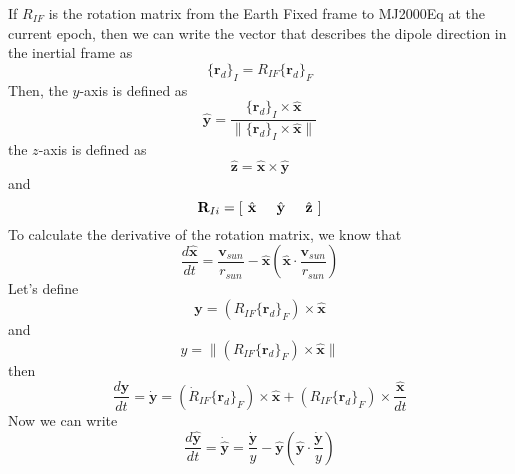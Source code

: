 {If $R_{IF}$ is the rotation matrix from the Earth Fixed frame to
MJ2000Eq at the current epoch, then we can write the vector that
describes the dipole direction in the inertial frame as
%
\begin{equation}
        \{\mathbf{r}_d\}_I =   R_{IF}\{\mathbf{r}_d\}_F
\end{equation}
%
Then, the $y$-axis is defined as
%
\begin{equation}
     \hat{\mathbf{y}} = \frac{\{\mathbf{r}_d\}_I \times \hat{\mathbf{x}}  }{\|  \{\mathbf{r}_d\}_I \times \hat{\mathbf{x}}   \|}
\end{equation}
%
the $z$-axis is defined as
%
\begin{equation}
     \hat{\mathbf{z}} = \hat{\mathbf{x}} \times \hat{\mathbf{y}}
\end{equation}
%
and
%
\begin{equation}
     \mathbf{R}_{Ii} = \left[\hspace{.05 in} \hat{\mathbf{x}} \hspace{.2 in} \hat{\mathbf{y}} \hspace{.2 in} \hat{\mathbf{z}} \hspace{.05 in} \right]
\end{equation}
%
To calculate the derivative of the rotation matrix, we know that
%
%
\begin{equation}
     \frac{d\hat{\mathbf{x}}}{dt} =      \displaystyle\frac{\mathbf{v}_{sun}}{r_{sun}}  -\displaystyle
     \hat{\mathbf{x}}
     \left(\hat{\mathbf{x}}  \cdot
     \frac{\mathbf{v}_{sun}}{r_{sun}} \right)
\end{equation}
%
Let's define
%
\begin{equation}
      \mathbf{y}  = (R_{IF}\{\mathbf{r}_d\}_F) \times
      \hat{\mathbf{x}}
\end{equation}
%
and
%
\begin{equation}
      y  = \|(R_{IF}\{\mathbf{r}_d\}_F) \times
      \hat{\mathbf{x}}\|
\end{equation}
%
then
%
\begin{equation}
      \frac{d\mathbf{y}}{dt}  = \dot{\mathbf{y}}=\left(\dot{R}_{IF}\{\mathbf{r}_d\}_F\right) \times
      \hat{\mathbf{x}} + \left(R_{IF}\{\mathbf{r}_d\}_F\right) \times
      \frac{\hat{\mathbf{x}}}{dt}
\end{equation}
%
Now we can write
%
\begin{equation}
     \frac{d\hat{\mathbf{y}}}{dt} = \dot{\hat{\mathbf{y}}} =
     \frac{\dot{\mathbf{y}}}{y} - \hat{\mathbf{y}}\left(\hat{\mathbf{y}} \cdot \frac{\dot{\mathbf{y}}}{y}  \right)

\end{equation}}
